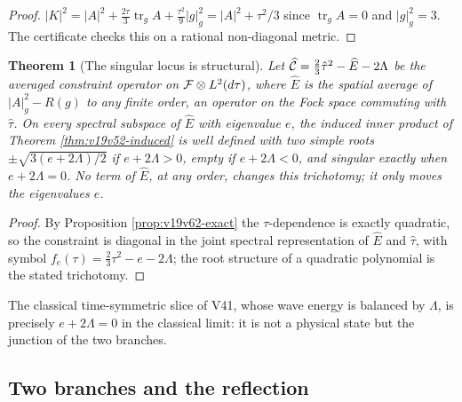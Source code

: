 \documentclass[11pt]{article}
\newtheorem{theorem}{Theorem}[section]
\theoremstyle{remark}
\begin{document}
\begin{proof}
\(|K|^2=|A|^2+\tfrac{2\tau}3\operatorname{tr}_gA+\tfrac{\tau^2}9|g|_g^2
=|A|^2+\tau^2/3\) since \(\operatorname{tr}_gA=0\) and \(|g|_g^2=3\).
The certificate checks this on a rational non-diagonal metric.
\end{proof}

\begin{theorem}[The singular locus is structural]
\label{thm:v19v62-locus}
Let \(\widehat{\cal C}=\tfrac23\hat\tau^2-\widehat E-2\Lambda\) be the
averaged constraint operator on \({\cal F}\otimes L^2(d\tau)\), where
\(\widehat E\) is the spatial average of \(|A|_g^2-R(g)\) to any
finite order, an operator on the Fock space commuting with
\(\hat\tau\).  On every spectral subspace of \(\widehat E\) with
eigenvalue \(e\), the induced inner product of Theorem
\ref{thm:v19v52-induced} is well defined with two simple roots
\(\pm\sqrt{3(e+2\Lambda)/2}\) if \(e+2\Lambda>0\), empty if
\(e+2\Lambda<0\), and singular exactly when \(e+2\Lambda=0\).  No term
of \(\widehat E\), at any order, changes this trichotomy; it only moves
the eigenvalues \(e\).
\end{theorem}

\begin{proof}
By Proposition \ref{prop:v19v62-exact} the \(\tau\)-dependence is
exactly quadratic, so the constraint is diagonal in the joint spectral
representation of \(\widehat E\) and \(\hat\tau\), with symbol
\(f_e(\tau)=\tfrac23\tau^2-e-2\Lambda\); the root structure of a
quadratic polynomial is the stated trichotomy.
\end{proof}

The classical time-symmetric slice of V41, whose wave energy is
balanced by \(\Lambda\), is precisely \(e+2\Lambda=0\) in the classical
limit: it is not a physical state but the junction of the two branches.

\subsection{Two branches and the reflection}
\end{document}
